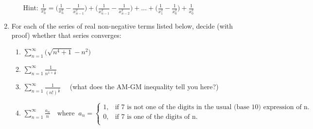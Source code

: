 \documentclass[11pt]{article}
\begin{document}
\begin{enumerate}[leftmargin=0pt, label=\arabic*)]
\begin{enumerate}[label=(\roman*)]
         Hint: \(\frac{1}{x_n^2} = \Big(\frac{1}{x_n^2} - \frac{1}{x_{n-1}^2}\Big) + \Big(\frac{1}{x_{n-1}^2} - 
         \frac{1}{x_{n-2}^2}\Big) + \dots + \Big(\frac{1}{x_1^2} - \frac{1}{x_0^2}\Big) + \frac{1}{x_0^2}\)
     \end{enumerate}
     \newpage
     
   \item For each of the series of real non-negative terms listed below, decide (with proof) whether that series converges:
     \begin{enumerate}[label=(\roman*)]
     \item \(\displaystyle\sum_{n=1}^{\infty} \Big(\sqrt{n^4 + 1} - n^2\Big)\)

     \item \(\displaystyle\sum_{n=1}^{\infty} \frac{1}{n^{1+\frac{1}{n}}}\)

     \item \(\displaystyle\sum_{n=1}^{\infty} \frac{1}{(n!)^{\frac{1}{n}}} \quad\) (what does the AM-GM inequality tell you here?)

     \item \(\displaystyle\sum_{n=1}^{\infty} \frac{a_n}{n} \quad \text{where} \;\; a_n = \begin{cases}
       1, & \text{if 7 is not one of the digits in the usual (base 10) expression of n.} \\
       0, & \text{if 7 is one of the digits of n.} \\
     \end{cases}\)
   \end{enumerate}
 \end{enumerate}
\end{document}
